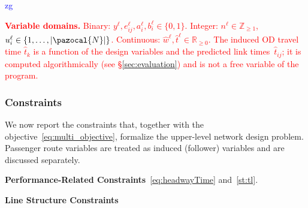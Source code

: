 \documentclass[a4paper,fleqn]{cas-sc}
\newcommand{\stkout}[1]{\ifmmode\text{\sout{\ensuremath{#1}}}\else\sout{#1}\fi}
\newcommand\rev[3]{\textcolor{blue}{\begin{scriptsize}{#1}\end{scriptsize}\stkout{#2}}\textcolor{red}{#3}}
\newcommand\rev[3]{\ignorespaces#3\ignorespaces\unskip}
\begin{document}
\rev{zg}{}{\noindent\textbf{Variable domains.} Binary: $y^\ell, e_{ij}^\ell, a_i^\ell, b_i^\ell \in \{0,1\}$. Integer: $n^\ell \in \mathbb{Z}_{\geq 1}$, $u_i^\ell \in \{1,\ldots,|\pazocal{N}|\}$. Continuous: $\hat{w}^\ell, \hat{t}^\ell \in \mathbb{R}_{\geq 0}$. The induced OD travel time $\hat{t}_k$ is a function of the design variables and the predicted link times~$\hat{t}_{ij}$; it is computed algorithmically (see \S{}\ref{sec:evaluation}) and is not a free variable of the program.}


\subsubsection{Constraints}
We now report the constraints that, together with the objective~\eqref{eq:multi_objective},
formalize the upper-level network design problem. Passenger route variables are treated as induced (follower) variables and are discussed separately.

\textbf{Performance-Related Constraints}~\eqref{eq:headwayTime} and~\eqref{st:tl}.

\textbf{Line Structure Constraints}
\end{document}
